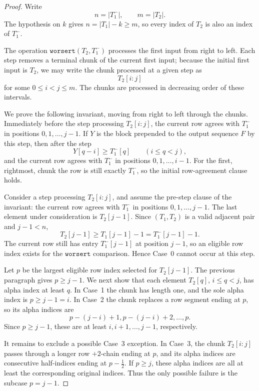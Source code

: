 \documentclass[11pt]{article}
\theoremstyle{plain}
\theoremstyle{definition}
\theoremstyle{remark}
\newcommand{\worsert}{\texttt{worsert}}
\begin{document}
\begin{proof}
Write
\[
  n=|T_1^-|,
  \qquad
  m=|T_2|.
\]
The hypothesis on \(k\) gives \(n=|T_1|-k\ge m\), so every index of
\(T_2\) is also an index of \(T_1^-\).

The operation \(\worsert(T_2,T_1^-)\) processes the first input from right to
left.  Each step removes a terminal chunk of the current first input; because
the initial first input is \(T_2\), we may write the chunk processed at a given
step as
\[
  T_2[i:j]
\]
for some \(0\le i<j\le m\).  The chunks are processed in decreasing order of
these intervals.

We prove the following invariant, moving from right to left through the chunks.
Immediately before the step processing \(T_2[i:j]\), the current row agrees
with \(T_1^-\) in positions \(0,1,\ldots,j-1\).  If \(Y\) is the block prepended
to the output sequence \(F\) by this step, then after the step
\[
  Y[q-i]\ge T_1^-[q]
  \qquad (i\le q<j),
\]
and the current row agrees with \(T_1^-\) in positions \(0,1,\ldots,i-1\).  For
the first, rightmost, chunk the row is still exactly \(T_1^-\), so the initial
row-agreement clause holds.

Consider a step processing \(T_2[i:j]\), and assume the pre-step clause of the
invariant: the current row agrees with \(T_1^-\) in positions
\(0,1,\ldots,j-1\).  The last element under consideration is \(T_2[j-1]\).
Since
\((T_1,T_2)\) is a valid adjacent pair and \(j-1<n\),
\[
  T_2[j-1]\ge T_1[j-1]-1=T_1^-[j-1]-1.
\]
The current row still has entry \(T_1^-[j-1]\) at position \(j-1\), so an
eligible row index exists for the \(\worsert\) comparison.  Hence Case~0 cannot
occur at this step.

Let \(p\) be the largest eligible row index selected for \(T_2[j-1]\).  The
previous paragraph gives \(p\ge j-1\).  We next show that each element
\(T_2[q]\), \(i\le q<j\), has alpha index at least \(q\).  In Case~1 the chunk
has length one, and the sole alpha index is \(p\ge j-1=i\).  In Case~2 the chunk
replaces a row segment ending at \(p\), so its alpha indices are
\[
  p-(j-i)+1,
  p-(j-i)+2,
  \ldots,
  p.
\]
Since \(p\ge j-1\), these are at least \(i,i+1,\ldots,j-1\), respectively.

It remains to exclude a possible Case~3 exception.  In Case~3, the chunk
\(T_2[i:j]\) passes through a longer row \(+2\)-chain ending at \(p\), and its
alpha indices are consecutive half-indices ending at \(p-\frac12\).  If
\(p\ge j\), these alpha indices are all at least the corresponding original
indices.  Thus the only possible failure is the subcase \(p=j-1\).


\end{proof}
\end{document}
